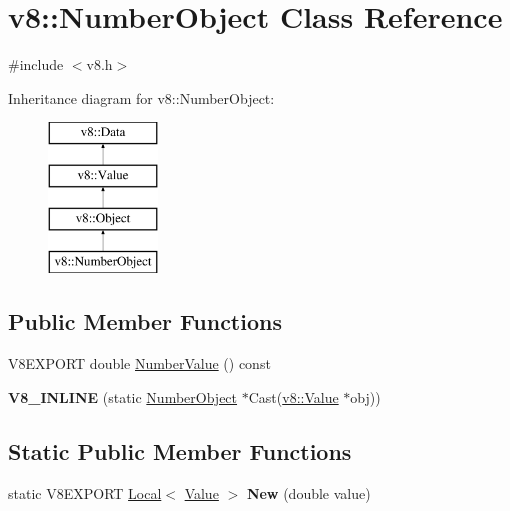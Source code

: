 \hypertarget{classv8_1_1_number_object}{}\section{v8\+:\+:Number\+Object Class Reference}
\label{classv8_1_1_number_object}


{\ttfamily \#include $<$v8.\+h$>$}

Inheritance diagram for v8\+:\+:Number\+Object\+:\begin{figure}[H]
\begin{center}
\leavevmode
\includegraphics[height=4.000000cm]{classv8_1_1_number_object}
\end{center}
\end{figure}
\subsection*{Public Member Functions}
\begin{DoxyCompactItemize}
\item 
V8\+E\+X\+P\+O\+R\+T double \hyperlink{classv8_1_1_number_object_a438a78ac8282978aae0acc805ca5e13c}{Number\+Value} () const 
\item 
\hypertarget{classv8_1_1_number_object_af8627ae8a973abb925b563309dfd74f8}{}{\bfseries V8\+\_\+\+I\+N\+L\+I\+N\+E} (static \hyperlink{classv8_1_1_number_object}{Number\+Object} $\ast$Cast(\hyperlink{classv8_1_1_value}{v8\+::\+Value} $\ast$obj))\label{classv8_1_1_number_object_af8627ae8a973abb925b563309dfd74f8}

\end{DoxyCompactItemize}
\subsection*{Static Public Member Functions}
\begin{DoxyCompactItemize}
\item 
\hypertarget{classv8_1_1_number_object_a70318ca87da57df8e1a26a1e486cf7fd}{}static V8\+E\+X\+P\+O\+R\+T \hyperlink{classv8_1_1_local}{Local}$<$ \hyperlink{classv8_1_1_value}{Value} $>$ {\bfseries New} (double value)\label{classv8_1_1_number_object_a70318ca87da57df8e1a26a1e486cf7fd}

\end{DoxyCompactItemize}


